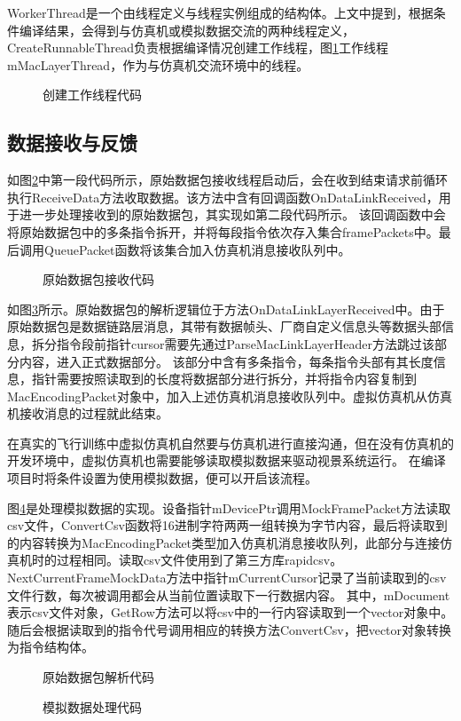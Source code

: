 \par
WorkerThread是一个由线程定义与线程实例组成的结构体。上文中提到，根据条件编译结果，会得到与仿真机或模拟数据交流的两种线程定义，
CreateRunnableThread负责根据编译情况创建工作线程，图\ref{code3}工作线程mMacLayerThread，作为与仿真机交流环境中的线程。
\begin{figure}[h!]
    \centering
     
    \caption{创建工作线程代码}
    \label{code3}
\end{figure}

\subsection{数据接收与反馈}
如图\ref{code4}中第一段代码所示，原始数据包接收线程启动后，会在收到结束请求前循环执行ReceiveData方法收取数据。该方法中含有回调函数OnDataLinkReceived，用于进一步处理接收到的原始数据包，其实现如第二段代码所示。
该回调函数中会将原始数据包中的多条指令拆开，并将每段指令依次存入集合framePackets中。最后调用QueuePacket函数将该集合加入仿真机消息接收队列中。
\begin{figure}[h!]
    \centering
     
    \caption{原始数据包接收代码}
    \label{code4}
\end{figure}

\par
如图\ref{code5}所示。原始数据包的解析逻辑位于方法OnDataLinkLayerReceived中。由于原始数据包是数据链路层消息，其带有数据帧头、厂商自定义信息头等数据头部信息，拆分指令段前指针cursor需要先通过ParseMacLinkLayerHeader方法跳过该部分内容，进入正式数据部分。
该部分中含有多条指令，每条指令头部有其长度信息，指针需要按照读取到的长度将数据部分进行拆分，并将指令内容复制到MacEncodingPacket对象中，加入上述仿真机消息接收队列中。虚拟仿真机从仿真机接收消息的过程就此结束。
\par
在真实的飞行训练中虚拟仿真机自然要与仿真机进行直接沟通，但在没有仿真机的开发环境中，虚拟仿真机也需要能够读取模拟数据来驱动视景系统运行。
在编译项目时将条件设置为使用模拟数据，便可以开启该流程。
\par
图\ref{code6}是处理模拟数据的实现。设备指针mDevicePtr调用MockFramePacket方法读取csv文件，ConvertCsv函数将16进制字符两两一组转换为字节内容，最后将读取到的内容转换为MacEncodingPacket类型加入仿真机消息接收队列，此部分与连接仿真机时的过程相同。读取csv文件使用到了第三方库rapidcsv。
NextCurrentFrameMockData方法中指针mCurrentCursor记录了当前读取到的csv文件行数，每次被调用都会从当前位置读取下一行数据内容。
其中，mDocument表示csv文件对象，GetRow方法可以将csv中的一行内容读取到一个vector对象中。随后会根据读取到的指令代号调用相应的转换方法ConvertCsv，把vector对象转换为指令结构体。
\begin{figure}[h!]
    \centering
     
    \caption{原始数据包解析代码}
    \label{code5}
\end{figure}
\begin{figure}[h!]
    \centering
     
    \caption{模拟数据处理代码}
    \label{code6}
\end{figure}


